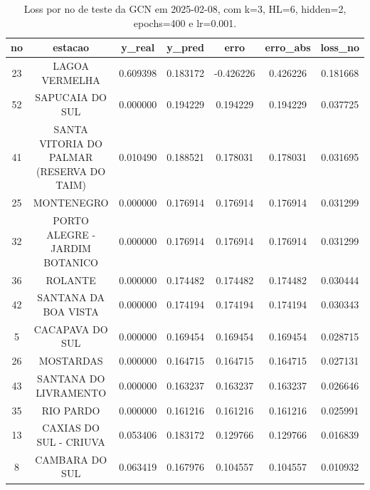 \begin{table}[h]
\centering
\caption{Loss por no de teste da GCN em 2025-02-08, com k=3, HL=6, hidden=2, epochs=400 e lr=0.001.}
\label{tab:gcn_loss_k3_hl6_h2_e400_d20250208}
\begin{tabular}{ccccccc}
\toprule
no & estacao & y\_real & y\_pred & erro & erro\_abs & loss\_no \\
\midrule
23 & LAGOA VERMELHA & 0.609398 & 0.183172 & -0.426226 & 0.426226 & 0.181668 \\
52 & SAPUCAIA DO SUL & 0.000000 & 0.194229 & 0.194229 & 0.194229 & 0.037725 \\
41 & SANTA VITORIA DO PALMAR (RESERVA DO TAIM) & 0.010490 & 0.188521 & 0.178031 & 0.178031 & 0.031695 \\
25 & MONTENEGRO & 0.000000 & 0.176914 & 0.176914 & 0.176914 & 0.031299 \\
32 & PORTO ALEGRE - JARDIM BOTANICO & 0.000000 & 0.176914 & 0.176914 & 0.176914 & 0.031299 \\
36 & ROLANTE & 0.000000 & 0.174482 & 0.174482 & 0.174482 & 0.030444 \\
42 & SANTANA DA BOA VISTA & 0.000000 & 0.174194 & 0.174194 & 0.174194 & 0.030343 \\
5 & CACAPAVA DO SUL & 0.000000 & 0.169454 & 0.169454 & 0.169454 & 0.028715 \\
26 & MOSTARDAS & 0.000000 & 0.164715 & 0.164715 & 0.164715 & 0.027131 \\
43 & SANTANA DO LIVRAMENTO & 0.000000 & 0.163237 & 0.163237 & 0.163237 & 0.026646 \\
35 & RIO PARDO & 0.000000 & 0.161216 & 0.161216 & 0.161216 & 0.025991 \\
13 & CAXIAS DO SUL - CRIUVA & 0.053406 & 0.183172 & 0.129766 & 0.129766 & 0.016839 \\
8 & CAMBARA DO SUL & 0.063419 & 0.167976 & 0.104557 & 0.104557 & 0.010932 \\
\bottomrule
\end{tabular}
\end{table}
